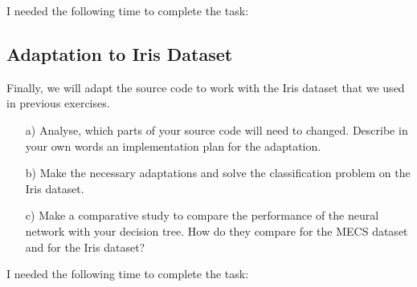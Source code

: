 I needed the following time to complete the task:

\subsection{Adaptation to Iris Dataset}

Finally, we will adapt the source code to work with the Iris dataset that we used in previous exercises. 

\begin{enumerate}

\item[a)] Analyse, which parts of your source code will need to changed. Describe in your own words an implementation plan for the adaptation.

\item[b)] Make the necessary adaptations and solve the classification problem on the Iris dataset.

\item[c)] Make a comparative study to compare the performance of the neural network with your decision tree. How do they compare for the MECS dataset and for the Iris dataset?

\end{enumerate}

I needed the following time to complete the task:

